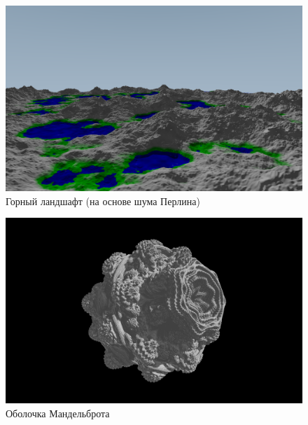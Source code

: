 \documentclass[12pt,a4paper]{article}
\begin{document}
\begin{figure}[H]
    \centering
    \includegraphics[width=\textwidth]{gallery1.png}
    \caption{Горный ландшафт (на основе шума Перлина)}
\end{figure}

\begin{figure}[H]
    \centering
    \includegraphics[width=\textwidth]{gallery4.png}
    \caption{Оболочка Мандельброта}
\end{figure}
\end{document}
